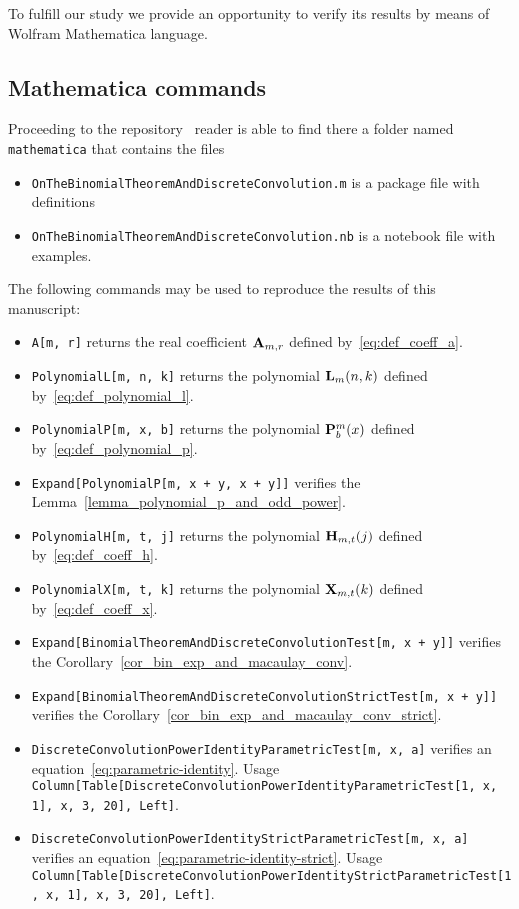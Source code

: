 To fulfill our study we provide an opportunity to verify its results by means of Wolfram Mathematica language.

\subsection{Mathematica commands} \label{subsec:mathematica-commands}
Proceeding to the repository~\cite{PK22Source} reader is able to find there a folder named \texttt{mathematica}
that contains the files
\begin{itemize}
    \item \texttt{OnTheBinomialTheoremAndDiscreteConvolution.m} is a package file with definitions
    \item \texttt{OnTheBinomialTheoremAndDiscreteConvolution.nb} is a notebook file with examples.
\end{itemize}
The following commands may be used to reproduce the results of this manuscript:
\begin{itemize}
    \item \texttt{A[m, r]} returns the real coefficient ${\mathbf{A}} \sb{m,r}$ defined by~\eqref{eq:def_coeff_a}.
    \item \texttt{PolynomialL[m, n, k]} returns the polynomial ${\mathbf{L}}\sb{m}(n,k)$ defined by~\eqref{eq:def_polynomial_l}.
    \item \texttt{PolynomialP[m, x, b]} returns the polynomial ${\mathbf{P}}\sp{m} \sb{b}(x)$ defined by~\eqref{eq:def_polynomial_p}.
    \item \texttt{Expand[PolynomialP[m, x + y, x + y]]} verifies the Lemma~\ref{lemma_polynomial_p_and_odd_power}.
    \item \texttt{PolynomialH[m, t, j]} returns the polynomial ${\mathbf{H}} \sb{m,t} (j)$ defined by~\eqref{eq:def_coeff_h}.
    \item \texttt{PolynomialX[m, t, k]} returns the polynomial ${\mathbf{X}}\sb{m,t} (k)$ defined by~\eqref{eq:def_coeff_x}.
    \item \texttt{Expand[BinomialTheoremAndDiscreteConvolutionTest[m, x + y]]} verifies the Corollary~\ref{cor_bin_exp_and_macaulay_conv}.
    \item \texttt{Expand[BinomialTheoremAndDiscreteConvolutionStrictTest[m, x + y]]} verifies the Corollary~\ref{cor_bin_exp_and_macaulay_conv_strict}.
    \item \texttt{DiscreteConvolutionPowerIdentityParametricTest[m, x, a]} verifies an equation~\eqref{eq:parametric-identity}.
    Usage \texttt{Column[Table[DiscreteConvolutionPowerIdentityParametricTest[1, x, 1], {x, 3, 20}], Left]}.
    \item \texttt{DiscreteConvolutionPowerIdentityStrictParametricTest[m, x, a]} verifies an equation~\eqref{eq:parametric-identity-strict}.
    Usage \texttt{Column[Table[DiscreteConvolutionPowerIdentityStrictParametricTest[1, x, 1], {x, 3, 20}], Left]}.
\end{itemize}

